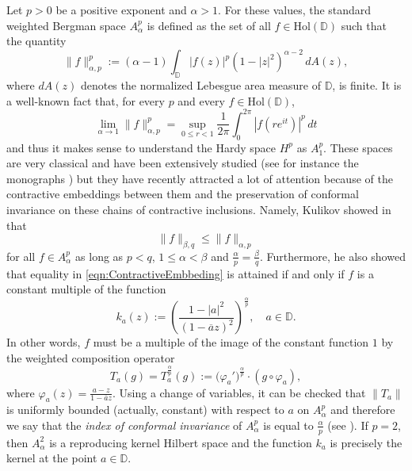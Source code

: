\documentclass[12pt]{amsart}
\theoremstyle{definition}
\newcommand{\D}{\mathbb{{D}}}
\newcommand{\Hol}{\mathrm{Hol}(\D)}
\numberwithin{equation}{section}
\begin{document}
        Let $p > 0$ be a positive exponent and $\alpha > 1$. For these values, the standard weighted Bergman space $A^p_\alpha$ is defined as the set of all $f \in \Hol$ such that the quantity
            \[
                \| f \|_{\alpha,p}^p := (\alpha - 1) \int_{\D} |f(z)|^p (1 - |z|^2)^{\alpha - 2} \, dA(z),
            \]
            where $dA(z)$ denotes the normalized Lebesgue area measure of $\D$, is finite. It is a well-known fact that, for every $p$ and every $f \in \Hol$,
            \[
                \lim_{\alpha \to 1} \| f \|_{\alpha,p}^p = \sup_{0 \leq r < 1} \dfrac{1}{2\pi} \int_0^{2\pi} |f(re^{it})|^p \, dt
            \]
            and thus it makes sense to understand the Hardy space $H^p$ as $A^p_1$. These spaces are very classical and have been extensively studied (see for instance the monographs \cite{MR268655, MR2033762, MR1758653, MR1669574}) but they have recently attracted a lot of attention because of the contractive embeddings between them and the preservation of conformal invariance on these chains of contractive inclusions. Namely, Kulikov showed in \cite{MR4472587} that
            \begin{equation} \label{eqn:ContractiveEmbbeding}
                \| f \|_{\beta,q} \leq \| f \|_{\alpha,p}
            \end{equation}
            for all $f \in A^p_\alpha$ as long as $p < q$, $1 \leq \alpha < \beta$ and $\frac{\alpha}{p} = \frac{\beta}{q}$. Furthermore, he also showed that equality in \eqref{eqn:ContractiveEmbbeding} is attained if and only if $f$ is a constant multiple of the function
            \[
                k_a (z) := \left( \frac{1 - |a|^2}{(1 - \overline{a}z)^2} \right)^\frac{\alpha}{p}, \quad a \in \D.
            \]
            In other words, $f$ must be a multiple of the image of the constant function $1$ by the weighted composition operator
            \begin{equation} \label{eqn:WComposition}
                T_a(g) = T_a^{\frac{\alpha}{p}} (g) :=\big( \varphi_a' \big)^\frac{\alpha}{p} \cdot (g \circ \varphi_a),
            \end{equation}
            where $\varphi_a (z) = \frac{a - z}{1 - \overline{a}z}$. Using a change of variables, it can be checked that $\| T_a \|$ is uniformly bounded (actually, constant) with respect to $a$ on $A^p_\alpha$ and therefore we say that the \emph{index of conformal invariance} of $A^p_\alpha$ is equal to $\frac{\alpha}{p}$ (see \cite{AM21}). If $p = 2$, then $A^2_\alpha$ is a reproducing kernel Hilbert space and the function $k_a$ is precisely the kernel at the point $a \in \D$.
\end{document}
